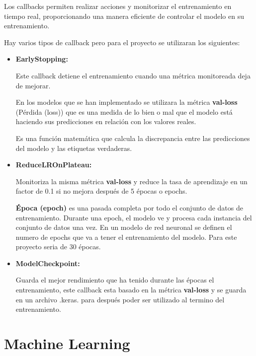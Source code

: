 \begin{itemize}
\begin{itemize}
	Los callbacks permiten realizar acciones y monitorizar el entrenamiento en tiempo real, proporcionando una manera eficiente de controlar el modelo en su entrenamiento.
	
	Hay varios tipos de callback pero para el proyecto se utilizaran los siguientes:
	
		\begin{itemize}
		\item
		\textbf{EarlyStopping:}
	
	Este callback detiene el entrenamiento cuando una métrica monitoreada deja de mejorar. 
	
	En los modelos que se han implementado se utilizara la métrica \textbf{val-loss} (Pérdida (loss)) que es una medida de lo bien o mal que el modelo está haciendo sus predicciones en relación con los valores reales. 
	
	Es una función matemática que calcula la discrepancia entre las predicciones del modelo y las etiquetas verdaderas.
	
		\item
		\textbf{ReduceLROnPlateau:}	
	
	Monitoriza la misma métrica \textbf{val-loss} y reduce la tasa de aprendizaje en un factor de 0.1 si no mejora después de 5 épocas o epochs.
	
	 \textbf{Época (epoch)} es una pasada completa por todo el conjunto de datos de entrenamiento. Durante una epoch, el modelo ve y procesa cada instancia del conjunto de datos una vez. En un modelo de red neuronal se definen el numero de epochs que va a tener el entrenamiento del modelo. Para este proyecto seria de 30 épocas.
	 
	 	 
	
		\item
		\textbf{ModelCheckpoint:}		
	
	Guarda el mejor rendimiento que ha tenido durante las épocas el entrenamiento, este callback esta basado en la métrica \textbf{val-loss} y se guarda en un archivo .keras. para después poder ser utilizado al termino del entrenamiento.
	

		\end{itemize}	
	
	\end{itemize}

\end{itemize}


\section{Machine Learning}

